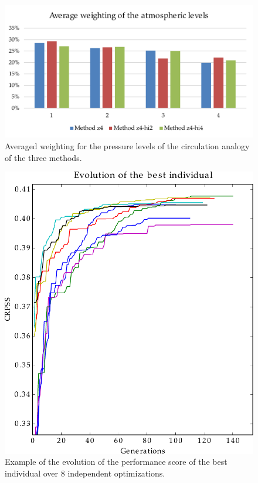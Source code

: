 \documentclass[5p]{elsarticle}
\begin{document}
\begin{figure}[htb]
	\centerline{\includegraphics[width=\linewidth]{figures/figure_levels_weights_average.pdf}}
	\caption{Averaged weighting for the pressure levels of the circulation analogy of the three methods.}
	\label{fig:levels_weights_average}
\end{figure}

\begin{figure}[htb]
	\centerline{\includegraphics[width=\linewidth]{figures/figure_evolution.pdf}}
	\caption{Example of the evolution of the performance score of the best individual over 8 independent optimizations.}
	\label{fig:evolution}
\end{figure}
\end{document}
